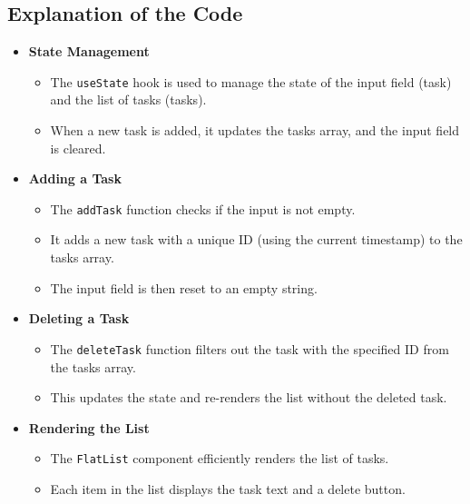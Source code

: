 \documentclass{article}
\begin{document}
\subsection{Explanation of the Code}
\begin{itemize}
    \item \textbf{State Management}
    \begin{itemize}
        \item The \texttt{useState} hook is used to manage the state of the input field (task) and the list of tasks (tasks).
        \item When a new task is added, it updates the tasks array, and the input field is cleared.
    \end{itemize}
    
    \item \textbf{Adding a Task}
    \begin{itemize}
        \item The \texttt{addTask} function checks if the input is not empty.
        \item It adds a new task with a unique ID (using the current timestamp) to the tasks array.
        \item The input field is then reset to an empty string.
    \end{itemize}
    
    \item \textbf{Deleting a Task}
    \begin{itemize}
        \item The \texttt{deleteTask} function filters out the task with the specified ID from the tasks array.
        \item This updates the state and re-renders the list without the deleted task.
    \end{itemize}
    
    \item \textbf{Rendering the List}
    \begin{itemize}
        \item The \texttt{FlatList} component efficiently renders the list of tasks.
        \item Each item in the list displays the task text and a delete button.
    \end{itemize}
\end{itemize}
\end{document}
